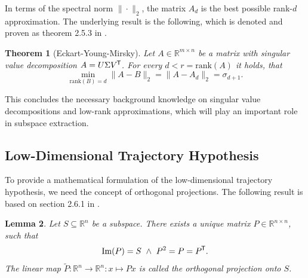 \documentclass[11pt, a4paper]{article}
\newtheorem{theorem}{Theorem}[section]
\newtheorem{lemma}[theorem]{Lemma}
\newcommand{\R}{\mathbb{R}}
\newcommand*{\tr}{^{\mkern-1.5mu\mathsf{T}}}
\begin{document}
In terms of the spectral norm $\| \cdot \|_2$, the matrix $A_d$ is the best possible rank-$d$ approximation. The underlying result is the following, which is denoted and proven as theorem 2.5.3 in \cite{SVD}.

\begin{theorem}[Eckart-Young-Mirsky] \label{thm:eym}
Let $A \in \R^{m \times n}$ be a matrix with singular value decomposition $A= U \Sigma V\tr $. For every $d < r = \text{rank}(A)$ it holds, that
\[ \min_{\text{rank}(B)=d} \big \| A-B \big \|_2 = \big \| A - A_d \big \|_2 = \sigma_{d+1}. \]
\end{theorem}

This concludes the necessary background knowledge on singular value decompositions and low-rank approximations, which will play an important role in subspace extraction.

\subsection{Low-Dimensional Trajectory Hypothesis}

To provide a mathematical formulation of the low-dimensional trajectory hypothesis, we need the concept of orthogonal projections. The following result is based on section 2.6.1 in \cite{SVD}.

\begin{lemma} \label{lem:orthProjection}
Let $S \subseteq \R^n$ be a subspace. There exists a unique matrix $P \in \R^{n \times n}$, such that
\[ \text{Im}(P) = S \ \wedge \ P^2 = P = P\tr . \]
The linear map $\tilde{P} : \R^n \to \R^n : x \mapsto Px$ is called the orthogonal projection onto $S$.
\end{lemma}
\end{document}
